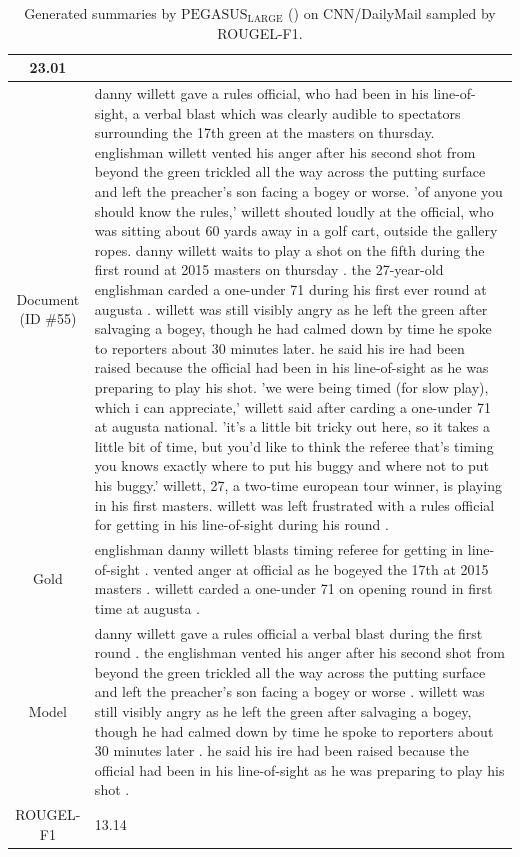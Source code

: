 \begin{table}[bth!]
\begin{tabular}{c|p{}}
23.01
\\ \hline
\makecell{Document\\(ID \#55)} & 
danny willett gave a rules official, who had been in his line-of-sight, a verbal blast which was clearly audible to spectators surrounding the 17th green at the masters on thursday. englishman willett vented his anger after his second shot from beyond the green trickled all the way across the putting surface and left the preacher's son facing a bogey or worse. 'of anyone you should know the rules,' willett shouted loudly at the official, who was sitting about 60 yards away in a golf cart, outside the gallery ropes. danny willett waits to play a shot on the fifth during the first round at 2015 masters on thursday . the 27-year-old englishman carded a one-under 71 during his first ever round at augusta . willett was still visibly angry as he left the green after salvaging a bogey, though he had calmed down by time he spoke to reporters about 30 minutes later. he said his ire had been raised because the official had been in his line-of-sight as he was preparing to play his shot. 'we were being timed (for slow play), which i can appreciate,' willett said after carding a one-under 71 at augusta national. 'it's a little bit tricky out here, so it takes a little bit of time, but you'd like to think the referee that's timing you knows exactly where to put his buggy and where not to put his buggy.' willett, 27, a two-time european tour winner, is playing in his first masters. willett was left frustrated with a rules official for getting in his line-of-sight during his round .
\\ \hline
Gold & 
englishman danny willett blasts timing referee for getting in line-of-sight . vented anger at official as he bogeyed the 17th at 2015 masters . willett carded a one-under 71 on opening round in first time at augusta .
\\ \hline
Model & 
danny willett gave a rules official a verbal blast during the first round . the englishman vented his anger after his second shot from beyond the green trickled all the way across the putting surface and left the preacher's son facing a bogey or worse . willett was still visibly angry as he left the green after salvaging a bogey, though he had calmed down by time he spoke to reporters about 30 minutes later . he said his ire had been raised because the official had been in his line-of-sight as he was preparing to play his shot .
\\ \hline
ROUGEL-F1 & 
13.14
\\ \hline
\end{tabular}
\caption{Generated summaries by $\text{PEGASUS}_{\text{LARGE}}$ (\gnews) on CNN/DailyMail sampled by ROUGEL-F1.}
\end{table}
